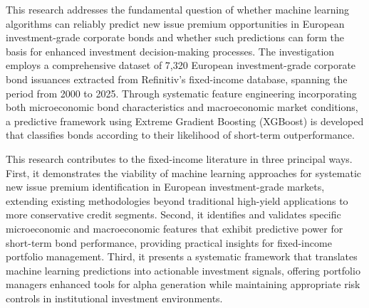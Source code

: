 This research addresses the fundamental question of whether machine learning algorithms can reliably predict new issue premium opportunities in European investment-grade corporate bonds and whether such predictions can form the basis for enhanced investment decision-making processes. The investigation employs a comprehensive dataset of 7,320 European investment-grade corporate bond issuances extracted from Refinitiv's fixed-income database, spanning the period from 2000 to 2025. Through systematic feature engineering incorporating both microeconomic bond characteristics and macroeconomic market conditions, a predictive framework using Extreme Gradient Boosting (XGBoost) is developed that classifies bonds according to their likelihood of short-term outperformance.

This research contributes to the fixed-income literature in three principal ways. First, it demonstrates the viability of machine learning approaches for systematic new issue premium identification in European investment-grade markets, extending existing methodologies beyond traditional high-yield applications to more conservative credit segments. Second, it identifies and validates specific microeconomic and macroeconomic features that exhibit predictive power for short-term bond performance, providing practical insights for fixed-income portfolio management. Third, it presents a systematic framework that translates machine learning predictions into actionable investment signals, offering portfolio managers enhanced tools for alpha generation while maintaining appropriate risk controls in institutional investment environments.